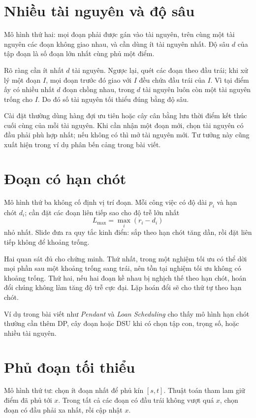 \documentclass[11pt]{article}
\newcommand{\depth}{d}
\begin{document}
\section{Nhiều tài nguyên và độ sâu}

Mô hình thứ hai: mọi đoạn phải được gán vào tài nguyên, trên cùng một tài
nguyên các đoạn không giao nhau, và cần dùng ít tài nguyên nhất. Độ sâu
\(\depth\) của tập đoạn là số đoạn lớn nhất cùng phủ một điểm.

Rõ ràng cần ít nhất \(\depth\) tài nguyên. Ngược lại, quét các đoạn theo đầu
trái; khi xử lý một đoạn \(I\), mọi đoạn trước đó giao với \(I\) đều chứa đầu
trái của \(I\). Vì tại điểm ấy có nhiều nhất \(\depth\) đoạn chồng nhau, trong
\(\depth\) tài nguyên luôn còn một tài nguyên trống cho \(I\). Do đó số tài
nguyên tối thiểu đúng bằng độ sâu.

Cài đặt thường dùng hàng đợi ưu tiên hoặc cây cân bằng lưu thời điểm kết thúc
cuối cùng của mỗi tài nguyên. Khi cần nhận một đoạn mới, chọn tài nguyên có
đầu phải phù hợp nhất; nếu không có thì mở tài nguyên mới. Tư tưởng này cũng
xuất hiện trong ví dụ phân bến cảng trong bài viết.

\section{Đoạn có hạn chót}

Mô hình thứ ba không cố định vị trí đoạn. Mỗi công việc có độ dài \(p_i\) và
hạn chót \(d_i\); cần đặt các đoạn liên tiếp sao cho độ trễ lớn nhất
\[
  L_{\max}=\max_i(r_i-d_i)
\]
nhỏ nhất. Slide đưa ra quy tắc kinh điển: sắp theo hạn chót tăng dần, rồi đặt
liên tiếp không để khoảng trống.

Hai quan sát đủ cho chứng minh. Thứ nhất, trong một nghiệm tối ưu có thể dời
mọi phần sau một khoảng trống sang trái, nên tồn tại nghiệm tối ưu không có
khoảng trống. Thứ hai, nếu hai đoạn kề nhau bị nghịch thế theo hạn chót, hoán
đổi chúng không làm tăng độ trễ cực đại. Lặp hoán đổi sẽ cho thứ tự theo hạn
chót.

Ví dụ trong bài viết như \textit{Pendant} và \textit{Loan Scheduling} cho thấy
mô hình hạn chót thường cần thêm DP, cây đoạn hoặc DSU khi có chọn tập con,
trọng số, hoặc nhiều tài nguyên.

\section{Phủ đoạn tối thiểu}

Mô hình thứ tư: chọn ít đoạn nhất để phủ kín \([s,t]\). Thuật toán tham lam
giữ điểm đã phủ tới \(x\). Trong tất cả các đoạn có đầu trái không vượt quá
\(x\), chọn đoạn có đầu phải xa nhất, rồi cập nhật \(x\).
\end{document}
